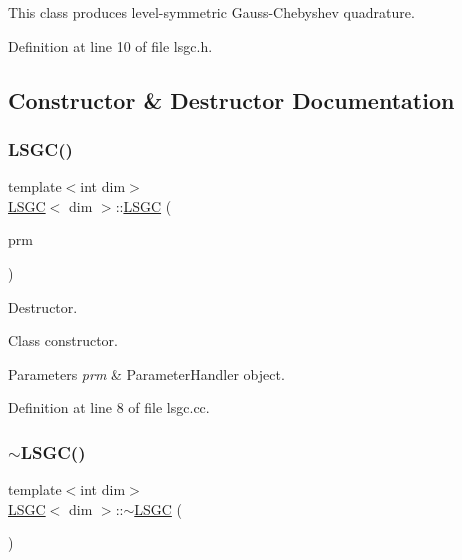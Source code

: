 This class produces level-\/symmetric Gauss-\/\+Chebyshev quadrature. 

Definition at line 10 of file lsgc.\+h.



\subsection{Constructor \& Destructor Documentation}
\mbox{\label{class_l_s_g_c_a9b89f615563bd3583a4a6a36d7b3eb7d}} 
\subsubsection{\texorpdfstring{L\+S\+G\+C()}{LSGC()}}
{\footnotesize\ttfamily template$<$int dim$>$ \\
\hyperlink{class_l_s_g_c}{L\+S\+GC}$<$ dim $>$\+::\hyperlink{class_l_s_g_c}{L\+S\+GC} (\begin{DoxyParamCaption}\item[{Parameter\+Handler \&}]{prm }\end{DoxyParamCaption})}



Destructor. 

Class constructor.


\begin{DoxyParams}{Parameters}
{\em prm} & Parameter\+Handler object. \\
\hline
\end{DoxyParams}


Definition at line 8 of file lsgc.\+cc.

\mbox{\label{class_l_s_g_c_abcba8afdb075485278288db321776b7e}} 
\subsubsection{\texorpdfstring{$\sim$\+L\+S\+G\+C()}{~LSGC()}}
{\footnotesize\ttfamily template$<$int dim$>$ \\
\hyperlink{class_l_s_g_c}{L\+S\+GC}$<$ dim $>$\+::$\sim$\hyperlink{class_l_s_g_c}{L\+S\+GC} (\begin{DoxyParamCaption}{ }\end{DoxyParamCaption})}



